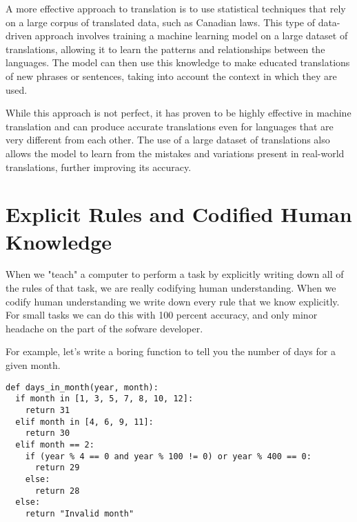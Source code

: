 A more effective approach to translation is to use statistical techniques that rely on a large corpus of translated data, such as Canadian laws. This type of data-driven approach involves training a machine learning model on a large dataset of translations, allowing it to learn the patterns and relationships between the languages. The model can then use this knowledge to make educated translations of new phrases or sentences, taking into account the context in which they are used.

While this approach is not perfect, it has proven to be highly effective in machine translation and can produce accurate translations even for languages that are very different from each other. The use of a large dataset of translations also allows the model to learn from the mistakes and variations present in real-world translations, further improving its accuracy.

\section{Explicit Rules and Codified Human Knowledge}

When we "teach" a computer to perform a task by explicitly writing down all of the rules of that task, we are really codifying human understanding. When we codify human understanding we write down every rule that we know explicitly. For small tasks we can do this with 100 percent accuracy, and only minor headache on the part of the sofware developer. 

For example, let's write a boring function to tell you the number of days for a given month. 

\begin{lstlisting}[style=kaolstplain,linewidth=1.5\textwidth]
def days_in_month(year, month):
  if month in [1, 3, 5, 7, 8, 10, 12]:
    return 31
  elif month in [4, 6, 9, 11]:
    return 30
  elif month == 2:
    if (year % 4 == 0 and year % 100 != 0) or year % 400 == 0:
      return 29
    else:
      return 28
  else:
    return "Invalid month"

\end{lstlisting}


